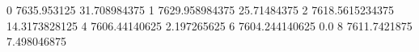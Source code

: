 0 7635.953125 31.708984375
1 7629.958984375 25.71484375
2 7618.5615234375 14.3173828125
4 7606.44140625 2.197265625
6 7604.244140625 0.0
8 7611.7421875 7.498046875
